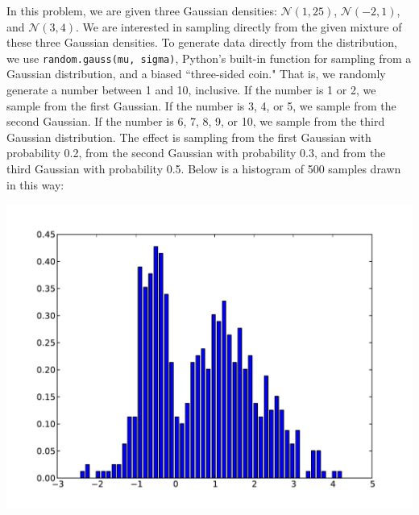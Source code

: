 \documentclass[solution, letterpaper]{cs121}
\begin{document}
\begin{empfile}
\subproblem %
In this problem, we are given three Gaussian densities: $\mathcal{N}(1,25)$, $\mathcal{N}(-2,1)$, and $\mathcal{N}(3,4)$. We are interested in sampling directly from the given mixture of these three Gaussian densities. To generate data directly from the distribution, we use {\tt random.gauss(mu, sigma)}, Python's built-in function for sampling from a Gaussian distribution, and a biased ``three-sided coin." That is, we randomly generate a number between 1 and 10, inclusive. If the number is 1 or 2, we sample from the first Gaussian. If the number is 3, 4, or 5, we sample from the second Gaussian. If the number is 6, 7, 8, 9, or 10, we sample from the third Gaussian distribution. The effect is sampling from the first Gaussian with probability 0.2, from the second Gaussian with probability 0.3, and from the third Gaussian with probability 0.5. Below is a histogram of 500 samples drawn in this way:
\begin{center}
\includegraphics[scale=0.8]{direct-sample-histogram.pdf}
\end{center}


\end{empfile}
\end{document}
